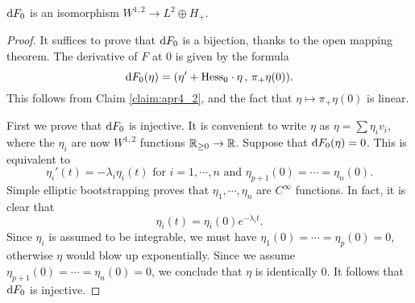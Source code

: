 \documentclass{amsart}
\begin{document}
\begin{prop} $\mathrm{d} F_{0}$ is an isomorphism $W^{1,2}\to L^{2}\oplus H_{+}$.
\end{prop}
\begin{proof}
  It suffices to prove that $\mathrm{d} F_{0}$ is a bijection, thanks to the open mapping theorem. The derivative of $F$ at $0$ is given by the formula
  \begin{equation*}
    \mathrm{d} F_{0}(\eta)=(\eta'+\text{Hess}_{0}\cdot \eta\,,\,\pi_{+}\eta(0)).
  \end{equation*}
  This follows from Claim \ref{claim:apr4_2}, and the fact that $\eta\mapsto \pi_{+}\eta(0)$ is linear.

  First we prove that $\mathrm{d} F_{0}$ is injective. It is convenient to write $\eta$ as $\eta=\sum \eta_{i}v_{i}$, where the $\eta_{i}$ are now $W^{1,2}$ functions $\mathbb{R}_{\ge 0}\to \mathbb{R}$. Suppose that $\mathrm{d} F_{0}(\eta)=0$. This is equivalent to
  \begin{equation*}
    \eta_{i}'(t)=-\lambda_{i}\eta_{i}(t)\text{ for $i=1,\cdots,n$}\text{ and }\eta_{p+1}(0)=\cdots=\eta_{n}(0).
  \end{equation*}
  Simple elliptic bootstrapping proves that $\eta_{1},\cdots,\eta_{n}$ are $C^{\infty}$ functions. In fact, it is clear that
  \begin{equation*}
    \eta_{i}(t)=\eta_{i}(0)e^{-\lambda_{i}t}.
  \end{equation*}
  Since $\eta_{i}$ is assumed to be integrable, we must have $\eta_{1}(0)=\cdots=\eta_{p}(0)=0$, otherwise $\eta$ would blow up exponentially. Since we assume $\eta_{p+1}(0)=\cdots=\eta_{n}(0)=0$, we conclude that $\eta$ is identically $0$. It follows that $\mathrm{d} F_{0}$ is injective. 
  

\end{proof}
\end{document}
